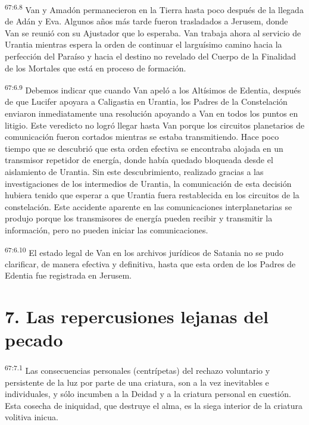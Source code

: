 \par
\textsuperscript{67:6.8} Van y Amadón permanecieron en la Tierra hasta poco después de la llegada de Adán y Eva. Algunos años más tarde fueron trasladados a Jerusem, donde Van se reunió con su Ajustador que lo esperaba. Van trabaja ahora al servicio de Urantia mientras espera la orden de continuar el larguísimo camino hacia la perfección del Paraíso y hacia el destino no revelado del Cuerpo de la Finalidad de los Mortales que está en proceso de formación.

\par
\textsuperscript{67:6.9} Debemos indicar que cuando Van apeló a los Altísimos de Edentia, después de que Lucifer apoyara a Caligastia en Urantia, los Padres de la Constelación enviaron inmediatamente una resolución apoyando a Van en todos los puntos en litigio. Este veredicto no logró llegar hasta Van porque los circuitos planetarios de comunicación fueron cortados mientras se estaba transmitiendo. Hace poco tiempo que se descubrió que esta orden efectiva se encontraba alojada en un transmisor repetidor de energía, donde había quedado bloqueada desde el aislamiento de Urantia. Sin este descubrimiento, realizado gracias a las investigaciones de los intermedios de Urantia, la comunicación de esta decisión hubiera tenido que esperar a que Urantia fuera restablecida en los circuitos de la constelación. Este accidente aparente en las comunicaciones interplanetarias se produjo porque los transmisores de energía pueden recibir y transmitir la información, pero no pueden iniciar las comunicaciones.

\par
\textsuperscript{67:6.10} El estado legal de Van en los archivos jurídicos de Satania no se pudo clarificar, de manera efectiva y definitiva, hasta que esta orden de los Padres de Edentia fue registrada en Jerusem.

\section*{7. Las repercusiones lejanas del pecado}
\par
\textsuperscript{67:7.1} Las consecuencias personales (centrípetas) del rechazo voluntario y persistente de la luz por parte de una criatura, son a la vez inevitables e individuales, y sólo incumben a la Deidad y a la criatura personal en cuestión. Esta cosecha de iniquidad, que destruye el alma, es la siega interior de la criatura volitiva inicua.

